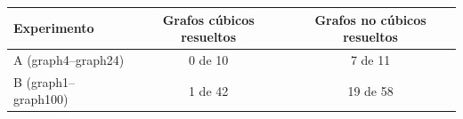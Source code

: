 \begin{tabular}{lcc}
\toprule
Experimento & Grafos cúbicos resueltos & Grafos no cúbicos resueltos \\
\midrule
A (graph4--graph24) & 0 de 10 & 7 de 11 \\
B (graph1--graph100) & 1 de 42 & 19 de 58 \\
\bottomrule
\end{tabular}
